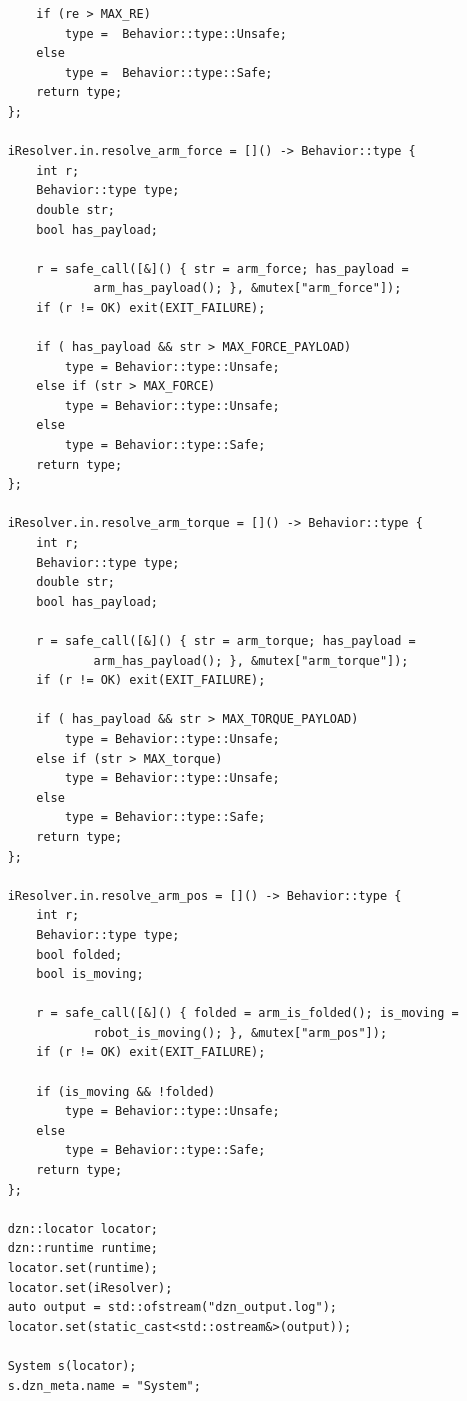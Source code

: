 \documentclass[12pt]{scrreprt}
\begin{document}
\begin{appendices}
\begin{verbatim}
        if (re > MAX_RE)
            type =  Behavior::type::Unsafe;
        else
            type =  Behavior::type::Safe;
        return type;
    };

    iResolver.in.resolve_arm_force = []() -> Behavior::type {
        int r;
        Behavior::type type;
        double str;
        bool has_payload;

        r = safe_call([&]() { str = arm_force; has_payload =
                arm_has_payload(); }, &mutex["arm_force"]);
        if (r != OK) exit(EXIT_FAILURE);

        if ( has_payload && str > MAX_FORCE_PAYLOAD)
            type = Behavior::type::Unsafe;
        else if (str > MAX_FORCE)
            type = Behavior::type::Unsafe;
        else
            type = Behavior::type::Safe;
        return type;
    };

    iResolver.in.resolve_arm_torque = []() -> Behavior::type {
        int r;
        Behavior::type type;
        double str;
        bool has_payload;

        r = safe_call([&]() { str = arm_torque; has_payload =
                arm_has_payload(); }, &mutex["arm_torque"]);
        if (r != OK) exit(EXIT_FAILURE);

        if ( has_payload && str > MAX_TORQUE_PAYLOAD)
            type = Behavior::type::Unsafe;
        else if (str > MAX_torque)
            type = Behavior::type::Unsafe;
        else
            type = Behavior::type::Safe;
        return type;
    };

    iResolver.in.resolve_arm_pos = []() -> Behavior::type {
        int r;
        Behavior::type type;
        bool folded;
        bool is_moving;

        r = safe_call([&]() { folded = arm_is_folded(); is_moving =
                robot_is_moving(); }, &mutex["arm_pos"]);
        if (r != OK) exit(EXIT_FAILURE);

        if (is_moving && !folded)
            type = Behavior::type::Unsafe;
        else
            type = Behavior::type::Safe;
        return type;
    };

    dzn::locator locator;
    dzn::runtime runtime;
    locator.set(runtime);
    locator.set(iResolver);
    auto output = std::ofstream("dzn_output.log");
    locator.set(static_cast<std::ostream&>(output));

    System s(locator);
    s.dzn_meta.name = "System";


\end{verbatim}
\end{appendices}
\end{document}
